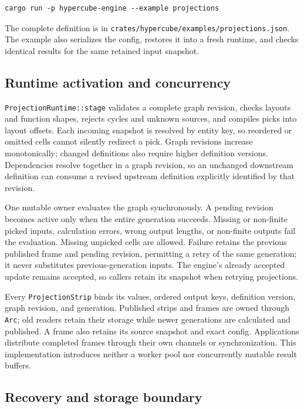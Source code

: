\documentclass{strategynet-journal}
\begin{document}
\begin{lstlisting}[style=slice]
cargo run -p hypercube-engine --example projections
\end{lstlisting}

The complete definition is in
\texttt{crates/hypercube/examples/projections.json}.  The example also serializes
the config, restores it into a fresh runtime, and checks identical results for
the same retained input snapshot.

\subsection{Runtime activation and concurrency}

\texttt{ProjectionRuntime::stage} validates a complete graph revision, checks
layouts and function shapes, rejects cycles and unknown sources, and compiles
picks into layout offsets.  Each incoming snapshot is resolved by entity key,
so reordered or omitted cells cannot silently redirect a pick.  Graph revisions
increase monotonically; changed definitions also require higher definition
versions.  Dependencies resolve together in a graph revision, so an unchanged
downstream definition can consume a revised upstream definition explicitly
identified by that revision.

One mutable owner evaluates the graph synchronously.  A pending revision becomes
active only when the entire generation succeeds.  Missing or non-finite picked
inputs, calculation errors, wrong output lengths, or non-finite outputs fail the
evaluation.  Missing unpicked cells are allowed.  Failure retains the previous
published frame and pending revision, permitting a retry of the same generation;
it never substitutes previous-generation inputs.  The engine's already accepted
update remains accepted, so callers retain its snapshot when retrying projections.

Every \texttt{ProjectionStrip} binds its values, ordered output keys, definition
version, graph revision, and generation.  Published strips and frames are owned
through \texttt{Arc}; old readers retain their storage while newer generations
are calculated and published.  A frame also retains its source snapshot and
exact config.  Applications distribute completed frames through their own
channels or synchronization.  This implementation introduces neither a worker
pool nor concurrently mutable result buffers.

\subsection{Recovery and storage boundary}
\end{document}
